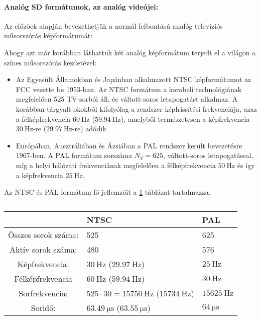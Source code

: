 \paragraph{Analóg SD formátumok, az analóg videójel:\\}

Az előzőek alapján bevezethetjük a normál felbontású analóg televíziós műsorszórás képformátumát:

Ahogy azt már korábban láthattuk két analóg képformátum terjedt el a világon a színes műsorszórás kezdetével:
\begin{itemize}
\item Az Egyesült Államokban és Japánban alkalmazott NTSC képformátumot az FCC vezette be 1953-ban.
Az NTSC formátum a korabeli technológiának megfelelően 525 TV-sorból áll, és váltott-soros letapogatást alkalmaz.
A korábban tárgyalt okokból kifolyólag a rendszer képfrissítési frekvenciája, azaz a félképfrekvencia $60~\mathrm{Hz}$ ($59.94~\mathrm{Hz}$), amelyből természetesen a képfrekvencia $30~\mathrm{Hz}$-re ($29.97~\mathrm{Hz}$-re) adódik.
\item Európában, Ausztráliában és Ázsiában a PAL rendszer került bevezetésre 1967-ben.
A PAL formátum sorszáma $N_V = 625$, váltott-soros letapogatással, míg a helyi hálózati frekvenciának megfelelően a félképfrekvencia $50~\mathrm{Hz}$ és így a képfrekvencia $25~\mathrm{Hz}$.
\end{itemize}
Az NTSC és PAL formátum fő jellemzőit a \ref{tab:sd_formats} táblázat tartalmazza.

\begin{table}[h!]
\caption{}
\renewcommand*{\arraystretch}{2.25}
\label{tab:sd_formats}
\begin{center}
    \begin{tabular}[h!]{ @{}c | | l | l @{} }%
				         &   NTSC  							       & PAL \\ \hline
    Összes sorok száma:	 &  525   								   &  625 \\
    Aktív sorok száma:   &  480   								   &  576 \\
    Képfrekvencia:       &  $30~\mathrm{Hz}$ ($29.97~\mathrm{Hz}$) & $25~\mathrm{Hz}$ \\
    Félképfrekvencia     &  $60~\mathrm{Hz}$ ($59.94~\mathrm{Hz}$) & $30~\mathrm{Hz}$ \\
    Sorfrekvencia: 		 &  $525 \cdot 30 = 15750~\mathrm{Hz}$ ($15734~\mathrm{Hz}$) & $15625~\mathrm{Hz}$ \\
    Soridő:              &  $63.49~\mathrm{\mu s}$ ($63.55~\mathrm{\mu s}$) & $64~\mathrm{\mu s}$ \\
    \end{tabular}
\end{center}
\end{table}

